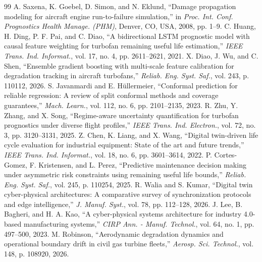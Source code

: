 \documentclass[12pt,a4paper]{article}
\begin{document}
\newpage
\begin{thebibliography}{99}
\small
{} A. Saxena, K. Goebel, D. Simon, and N. Eklund, ``Damage propagation modeling for aircraft engine run-to-failure simulation,'' in \textit{Proc. Int. Conf. Prognostics Health Manage. (PHM)}, Denver, CO, USA, 2008, pp. 1--9.
 C. Huang, H. Ding, P. F. Pai, and C. Diao, ``A bidirectional LSTM prognostic model with causal feature weighting for turbofan remaining useful life estimation,'' \textit{IEEE Trans. Ind. Informat.}, vol. 17, no. 4, pp. 2611--2621, 2021.
 X. Diao, J. Wu, and C. Shen, ``Ensemble gradient boosting with multi-scale feature calibration for degradation tracking in aircraft turbofans,'' \textit{Reliab. Eng. Syst. Saf.}, vol. 243, p. 110112, 2026.
 S. Javanmardi and E. H\"ullermeier, ``Conformal prediction for reliable regression: A review of split conformal methods and coverage guarantees,'' \textit{Mach. Learn.}, vol. 112, no. 6, pp. 2101--2135, 2023.
 R. Zhu, Y. Zhang, and X. Song, ``Regime-aware uncertainty quantification for turbofan prognostics under diverse flight profiles,'' \textit{IEEE Trans. Ind. Electron.}, vol. 72, no. 3, pp. 3120--3131, 2025.
 Z. Chen, K. Liang, and X. Wang, ``Digital twin-driven life cycle evaluation for industrial equipment: State of the art and future trends,'' \textit{IEEE Trans. Ind. Informat.}, vol. 18, no. 6, pp. 3601--3614, 2022.
 P. Cortes-Gomez, F. Kristensen, and L. Perez, ``Predictive maintenance decision making under asymmetric risk constraints using remaining useful life bounds,'' \textit{Reliab. Eng. Syst. Saf.}, vol. 245, p. 110254, 2025.
 R. Walia and S. Kumar, ``Digital twin cyber-physical architectures: A comparative survey of synchronization protocols and edge intelligence,'' \textit{J. Manuf. Syst.}, vol. 78, pp. 112--128, 2026.
 J. Lee, B. Bagheri, and H. A. Kao, ``A cyber-physical systems architecture for industry 4.0-based manufacturing systems,'' \textit{CIRP Ann. - Manuf. Technol.}, vol. 64, no. 1, pp. 497--500, 2023.
 M. Robinson, ``Aerodynamic degradation dynamics and operational boundary drift in civil gas turbine fleets,'' \textit{Aerosp. Sci. Technol.}, vol. 148, p. 108920, 2026.

\end{thebibliography}
\end{document}
